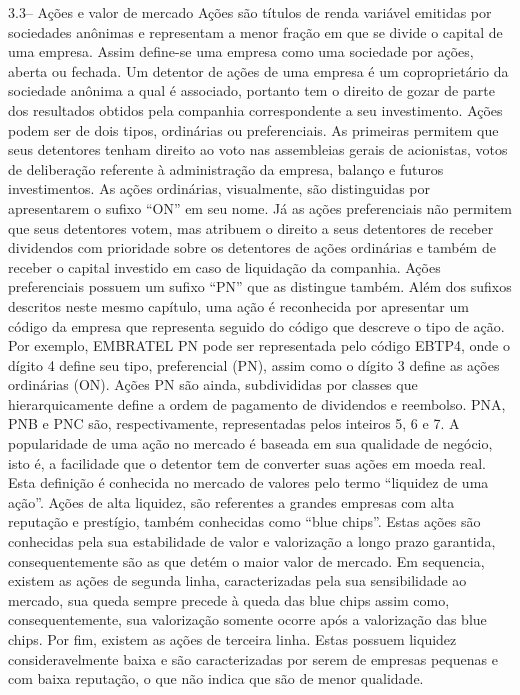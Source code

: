 \documentclass[brazil,twocolumn]{svjour3}
\begin{document}
3.3– Ações e valor de mercado
Ações são títulos de renda variável emitidas por sociedades anônimas e representam a menor fração em que se divide o capital de uma empresa. Assim define-se uma empresa como uma sociedade por ações, aberta ou fechada. Um detentor de ações de uma empresa é um coproprietário da sociedade anônima a qual é associado, portanto tem o direito de gozar de parte dos resultados obtidos pela companhia correspondente a seu investimento.
Ações podem ser de dois tipos, ordinárias ou preferenciais. As primeiras permitem que seus detentores tenham direito ao voto nas assembleias gerais de acionistas, votos de deliberação referente à administração da empresa, balanço e futuros investimentos. As ações ordinárias, visualmente, são distinguidas por apresentarem o sufixo “ON” em seu nome. Já as ações preferenciais não permitem que seus detentores votem, mas atribuem o direito a seus detentores de receber dividendos com prioridade sobre os detentores de ações ordinárias e também de receber o capital investido em caso de liquidação da companhia. Ações preferenciais possuem um sufixo “PN” que as distingue também.
Além dos sufixos descritos neste mesmo capítulo, uma ação é reconhecida por apresentar um código da empresa que representa seguido do código que descreve o tipo de ação. Por exemplo, EMBRATEL PN pode ser representada pelo código EBTP4, onde o dígito 4 define seu tipo, preferencial (PN), assim como o dígito 3 define as ações ordinárias (ON).
Ações PN são ainda, subdivididas por classes que hierarquicamente define a ordem de pagamento de dividendos e reembolso. PNA, PNB e PNC são, respectivamente, representadas pelos inteiros 5, 6 e 7.
A popularidade de uma ação no mercado é baseada em sua qualidade de negócio, isto é, a facilidade que o detentor tem de converter suas ações em moeda real. Esta definição é conhecida no mercado de valores pelo termo “liquidez de uma ação”. Ações de alta liquidez, são referentes a grandes empresas com alta reputação e prestígio, também conhecidas como “blue chips”. Estas ações são conhecidas pela sua estabilidade de valor e valorização a longo prazo garantida, consequentemente são as que detém o maior valor de mercado.
Em sequencia, existem as ações de segunda linha, caracterizadas pela sua sensibilidade ao mercado, sua queda sempre precede à queda das blue chips assim como, consequentemente,  sua valorização somente ocorre após a valorização das blue chips.
Por fim, existem as ações de terceira linha. Estas possuem liquidez consideravelmente baixa e são caracterizadas por serem de empresas pequenas e com baixa reputação, o que não indica que são de menor qualidade.
\end{document}
